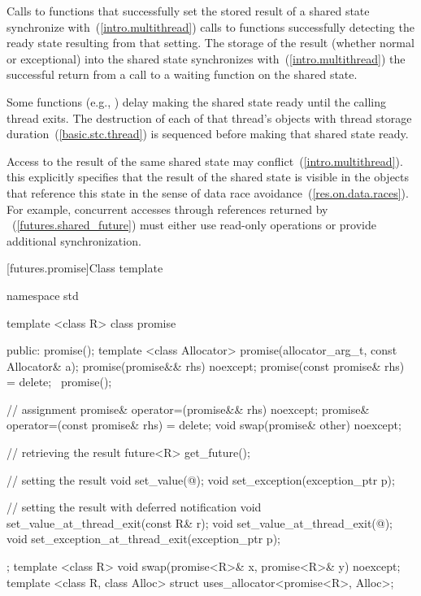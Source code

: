 \pnum
Calls to functions that successfully set the stored result of a shared
state synchronize
with~(\ref{intro.multithread}) calls to functions
successfully detecting the ready state resulting from that setting.
The storage of the result
(whether normal or exceptional) into the shared state
synchronizes with~(\ref{intro.multithread})
the successful return from a call to a waiting function on the shared state.

\pnum
Some functions (e.g., ) delay making
the shared state ready until the calling thread exits. The destruction of
each of that thread's objects with thread storage duration~(\ref{basic.stc.thread})
is sequenced before making that shared state ready.

\pnum
Access to the result of the same shared state may conflict~(\ref{intro.multithread}).
\enternote this explicitly specifies that the result of the shared state is
visible in the objects that reference this state in the sense of data race
avoidance~(\ref{res.on.data.races}). For example, concurrent accesses through
references returned by ~(\ref{futures.shared_future})
must either use read-only operations or provide additional synchronization.
\exitnote

[futures.promise]{Class template }

\begin{codeblock}
namespace std {
  template <class R>
  class promise {
  public:
    promise();
    template <class Allocator>
      promise(allocator_arg_t, const Allocator& a);
    promise(promise&& rhs) noexcept;
    promise(const promise& rhs) = delete;
    ~promise();

    // assignment
    promise& operator=(promise&& rhs) noexcept;
    promise& operator=(const promise& rhs) = delete;
    void swap(promise& other) noexcept;

    // retrieving the result
    future<R> get_future();

    // setting the result
    void set_value(@\seebelow@);
    void set_exception(exception_ptr p);

    // setting the result with deferred notification
    void set_value_at_thread_exit(const R& r);
    void set_value_at_thread_exit(@\seebelow@);
    void set_exception_at_thread_exit(exception_ptr p);
  };
  template <class R>
    void swap(promise<R>& x, promise<R>& y) noexcept;
  template <class R, class Alloc>
    struct uses_allocator<promise<R>, Alloc>;
}
\end{codeblock}

